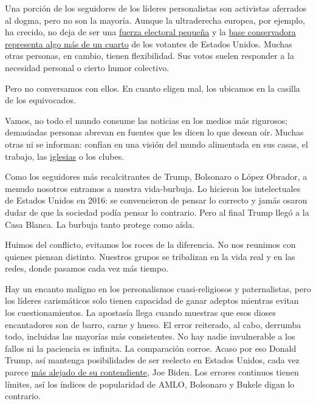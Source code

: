 Una porción de los seguidores de los líderes personalistas son
activistas aferrados al dogma, pero no son la mayoría. Aunque la
ultraderecha europea, por ejemplo, ha crecido, no deja de ser una
\href{https://www.bbc.com/news/world-europe-46422036}{fuerza electoral
pequeña} y la
\href{https://news.gallup.com/poll/15370/party-affiliation.aspx}{base
conservadora representa algo más de un cuarto} de los votantes de
Estados Unidos. Muchas otras personas, en cambio, tienen flexibilidad.
Sus votos suelen responder a la necesidad personal o cierto humor
colectivo.

Pero no conversamos con ellos. En cuanto eligen mal, los ubicamos en la
casilla de los equivocados.

Vamos, no todo el mundo consume las noticias en los medios más
rigurosos; demasiadas personas abrevan en fuentes que les dicen lo que
desean oír. Muchas otras ni se informan: confían en una visión del mundo
alimentada en sus casas, el trabajo, las
\href{https://www.nytimes3xbfgragh.onion/es/2020/08/13/espanol/estados-unidos/trump-cristianos-evangelicos.html}{iglesias}
o los clubes.

Como los seguidores más recalcitrantes de Trump, Bolsonaro o López
Obrador, a menudo nosotros entramos a nuestra vida-burbuja. Lo hicieron
los intelectuales de Estados Unidos en 2016: se convencieron de pensar
lo correcto y jamás osaron dudar de que la sociedad podía pensar lo
contrario. Pero al final Trump llegó a la Casa Blanca. La burbuja tanto
protege como aísla.

Huimos del conflicto, evitamos los roces de la diferencia. No nos
reunimos con quienes piensan distinto. Nuestros grupos se tribalizan en
la vida real y en las redes, donde pasamos cada vez más tiempo.

Hay un encanto maligno en los personalismos cuasi-religiosos y
paternalistas, pero los líderes carismáticos solo tienen capacidad de
ganar adeptos mientras evitan los cuestionamientos. La apostasía llega
cuando muestras que esos dioses encantadores son de barro, carne y
hueso. El error reiterado, al cabo, derrumba todo, incluidas las
mayorías más consistentes. No hay nadie invulnerable a los fallos ni la
paciencia es infinita. La comparación corroe. Acaso por eso Donald
Trump, así mantenga posibilidades de ser reelecto en Estados Unidos,
cada vez parece
\href{https://www.nytimes3xbfgragh.onion/2020/08/17/upshot/polls-2020-election-convention.html}{más
alejado de su contendiente}, Joe Biden. Los errores continuos tienen
límites, así los índices de popularidad de AMLO, Bolsonaro y Bukele
digan lo contrario.

